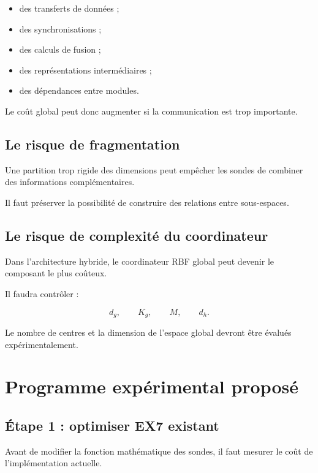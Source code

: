 \documentclass[11pt,a4paper]{report}
\begin{document}
\begin{itemize}
  \item des transferts de données ;
  \item des synchronisations ;
  \item des calculs de fusion ;
  \item des représentations intermédiaires ;
  \item des dépendances entre modules.
\end{itemize}

Le coût global peut donc augmenter si la communication
est trop importante.

\section{Le risque de fragmentation}

Une partition trop rigide des dimensions peut empêcher
les sondes de combiner des informations complémentaires.

Il faut préserver la possibilité de construire
des relations entre sous-espaces.

\section{Le risque de complexité du coordinateur}

Dans l'architecture hybride, le coordinateur RBF global
peut devenir le composant le plus coûteux.

Il faudra contrôler :

\[
d_g,\qquad K_g,\qquad M,\qquad d_h.
\]

Le nombre de centres et la dimension de l'espace global
devront être évalués expérimentalement.

\chapter{Programme expérimental proposé}

\section{Étape 1 : optimiser EX7 existant}

Avant de modifier la fonction mathématique des sondes,
il faut mesurer le coût de l'implémentation actuelle.
\end{document}
